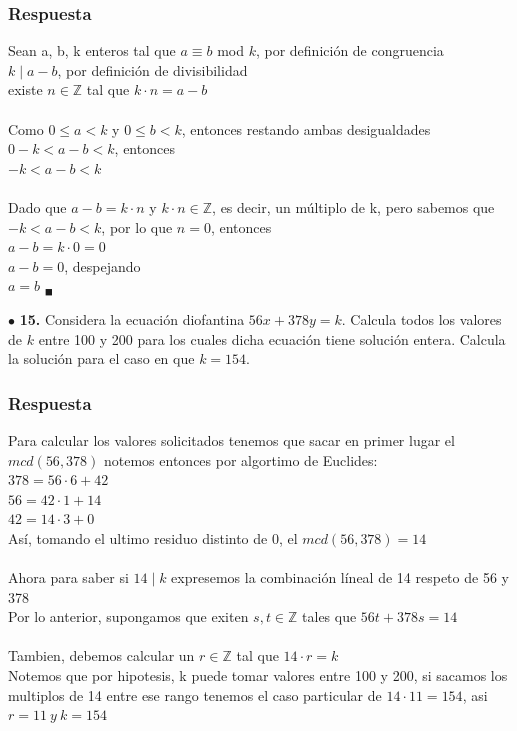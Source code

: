 \documentclass[12pt]{article}
\begin{document}
	\subsubsection*{Respuesta}
	Sean a, b, k enteros tal que $a \equiv b$ mod $k$, por definición de congruencia \\
	$k \mid a-b$, por definición de divisibilidad \\
	existe $n \in \mathbb{Z}$ tal que $k \cdot n = a-b$ \\
	\\
	Como $0 \leq a < k$ y $0 \leq b < k$, entonces restando ambas desigualdades \\
	$0-k < a-b < k$, entonces\\
	$-k < a-b <k$ \\
	\\
	Dado que $a-b = k \cdot n $ y $k \cdot n \in \mathbb{Z}$, es decir, un múltiplo de k, pero sabemos que \\
	$-k < a-b <k$, por lo que $n=0$, entonces \\
	$a-b = k \cdot 0 = 0$ \\
	$a-b = 0$, despejando\\
	$a=b$ $_\blacksquare$
	
	\vspace{1cm}
	$\bullet$ \textbf{15.} Considera la ecuación diofantina $56x + 378y= k$. Calcula todos los valores de $k$ entre 100 y 200 para
	los cuales dicha ecuación tiene solución entera. Calcula la solución para el caso en que $k = 154$.
	\subsubsection*{Respuesta}
	Para calcular los valores solicitados tenemos que sacar en primer lugar el $mcd(56,378)$ notemos entonces por algortimo de Euclides:\\
	$378=56 \cdot 6+42$\\
	$56=42 \cdot 1+14$\\
	$42=14 \cdot 3+0$\\
	Así, tomando el ultimo residuo distinto de 0, el $mcd(56,378)=14$\\
	\\
	Ahora para saber si $14 \mid k$ expresemos la combinación líneal de 14 respeto de 56 y 378\\
	Por lo anterior, supongamos que exiten $s,t \in \mathbb{Z}$ tales que $56t+378s=14$\\
	\\
	Tambien, debemos calcular un $r \in \mathbb{Z}$ tal que $14 \cdot r=k$\\
	Notemos que por hipotesis, k puede tomar valores entre 100 y 200, si sacamos los multiplos de 14 entre ese rango tenemos el caso particular de $14 \cdot 11 = 154$, asi $r=11 \ y \ k=154$\\
	
\end{document}
